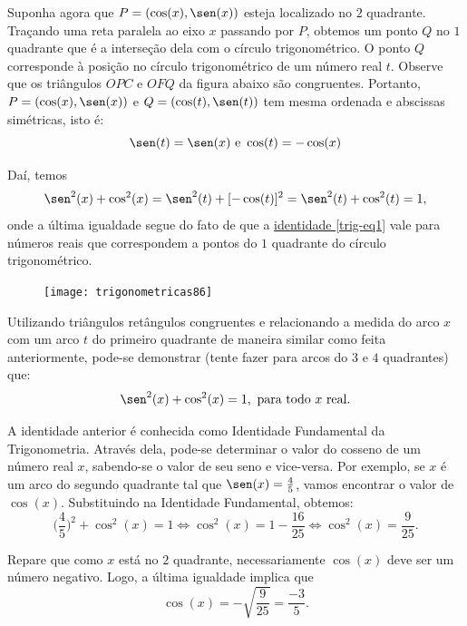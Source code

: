 Suponha agora que $P=(\cos(x), \sen(x))$ esteja localizado no $2$ quadrante. Traçando uma reta paralela ao eixo $x$ passando por $P$, obtemos um ponto $Q$ no $1$ quadrante que é a interseção dela com o círculo trigonométrico. O ponto $Q$ corresponde à posição no círculo trigonométrico de um número real $t$. Observe que os triângulos $OPC$ e $OFQ$ da figura abaixo são congruentes. Portanto, $P = (\cos(x), \sen(x))$ e $Q = (\cos(t), \sen(t))$ tem mesma ordenada e abscissas simétricas, isto é:
\begin{equation*}
\sen(t)=\sen(x)\text{ e }\cos(t)=-\cos(x)
\end{equation*}

Daí, temos 
\begin{equation*}
\sen^2(x) + \cos^2(x) = \sen^2(t) + [-\cos(t)]^2 = \sen^2(t) + \cos^2(t) = 1,
\end{equation*}
onde a última igualdade segue do fato de que a \hyperref[trig-eq1]{identidade \ref{trig-eq1}} vale para números reais que correspondem a pontos do $1$ quadrante do círculo trigonométrico.

\begin{figure}[H]
\centering

\texttt{[image: trigonometricas86]}
\end{figure}

Utilizando triângulos retângulos congruentes e relacionando a medida do arco $x$ com um arco $t$ do primeiro quadrante de maneira similar como feita anteriormente, pode-se demonstrar (tente fazer para arcos do $3$ e $4$ quadrantes) que:
\begin{equation*}
\sen^2(x)+\cos^2(x)=1,\text{ para todo $x$ real}.
\end{equation*}

A identidade anterior é conhecida como Identidade Fundamental da Trigonometria. Através dela, pode-se determinar o valor do cosseno de um número real $x$, sabendo-se o valor de seu seno e vice-versa. Por exemplo, se $x$ é um arco do segundo quadrante tal que $\sen(x)=\frac{4}{5}$, vamos encontrar o valor de $\cos(x)$. Substituindo na Identidade Fundamental, obtemos:
\begin{equation*}
\bigg(\frac{4}{5}\bigg)^2+\cos^2(x)=1\iff\cos^2(x)=1-\frac{16}{25}\iff\cos^2(x)=\frac{9}{25}.
\end{equation*}

Repare que como $x$ está no $2$ quadrante, necessariamente $\cos(x)$ deve ser um número negativo. Logo, a última igualdade implica que 
\begin{equation*}
\cos(x) = -\sqrt{\frac{9}{25}}=\frac{-3}{5}.
\end{equation*} 

